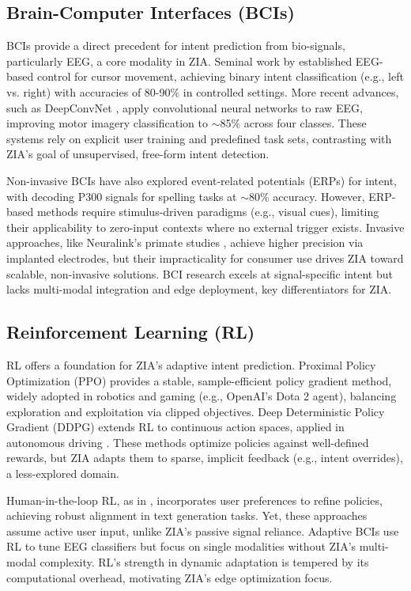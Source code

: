 \subsection{Brain-Computer Interfaces (BCIs)}
BCIs provide a direct precedent for intent prediction from bio-signals, particularly EEG, a core modality in ZIA. Seminal work by \cite{wolpaw2002brain} established EEG-based control for cursor movement, achieving binary intent classification (e.g., left vs. right) with accuracies of 80-90\% in controlled settings. More recent advances, such as DeepConvNet \cite{schirrmeister2017deepconvnet}, apply convolutional neural networks to raw EEG, improving motor imagery classification to $\sim$85\% across four classes. These systems rely on explicit user training and predefined task sets, contrasting with ZIA's goal of unsupervised, free-form intent detection.

Non-invasive BCIs have also explored event-related potentials (ERPs) for intent, with \cite{blankertz2011single} decoding P300 signals for spelling tasks at $\sim$80\% accuracy. However, ERP-based methods require stimulus-driven paradigms (e.g., visual cues), limiting their applicability to zero-input contexts where no external trigger exists. Invasive approaches, like Neuralink's primate studies \cite{musk2021neuralink}, achieve higher precision via implanted electrodes, but their impracticality for consumer use drives ZIA toward scalable, non-invasive solutions. BCI research excels at signal-specific intent but lacks multi-modal integration and edge deployment, key differentiators for ZIA.

\subsection{Reinforcement Learning (RL)}
RL offers a foundation for ZIA's adaptive intent prediction. Proximal Policy Optimization (PPO) \cite{schulman2017proximal} provides a stable, sample-efficient policy gradient method, widely adopted in robotics and gaming (e.g., OpenAI's Dota 2 agent), balancing exploration and exploitation via clipped objectives. Deep Deterministic Policy Gradient (DDPG) \cite{lillicrap2015continuous} extends RL to continuous action spaces, applied in autonomous driving \cite{sallab2017deep}. These methods optimize policies against well-defined rewards, but ZIA adapts them to sparse, implicit feedback (e.g., intent overrides), a less-explored domain.

Human-in-the-loop RL, as in \cite{christiano2017deep}, incorporates user preferences to refine policies, achieving robust alignment in text generation tasks. Yet, these approaches assume active user input, unlike ZIA's passive signal reliance. Adaptive BCIs \cite{shenoy2006towards} use RL to tune EEG classifiers but focus on single modalities without ZIA's multi-modal complexity. RL's strength in dynamic adaptation is tempered by its computational overhead, motivating ZIA's edge optimization focus.

